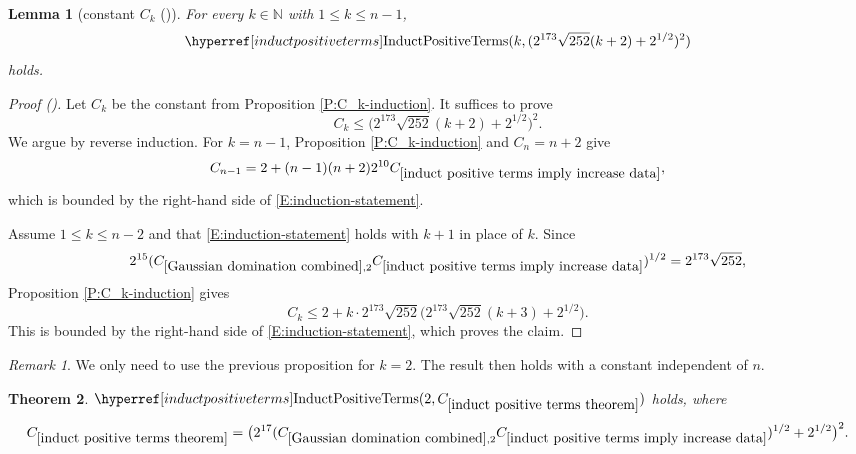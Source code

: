 \documentclass[12pt,reqno]{amsart}
\newcommand{\auto}{{({\tiny\faCar})}}
\theoremstyle{plain}
\newtheorem{theorem}{Theorem}[section]
\newtheorem{lemma}[theorem]{Lemma}
\numberwithin{equation}{section}
\theoremstyle{remark}
\newtheorem{rem}{Remark}[section]
\newcommand{\uses}[1]{}
\newcommand{\usesdefs}[1]{}
\newcommand{\N}{{\mathbb N}}
\newcommand{\ls}[1]{{\color{red}{[L: #1]}}}
\newcommand{\jr}[1]{{\color{orange}{[J: #1]}}}
\begin{document}
\ls{I have improved the constants, so that the final result holds with a constant independent of $n$.}
\jr{Oh, of course, because we only lose $k$ in the $k$th step and this is killed by the square root! So it was there already, I just inefficiently estimated the inducted constant, my bad! Very nice}
\begin{lemma}[constant $C_k$ \auto]\label{P:better-induction}\uses{P:C_k-induction,Gaussian domination combined,induct positive terms imply increase data}\usesdefs{induct positive terms}
For every $k\in\N$ with $1\le k\le n-1$,
\begin{equation}\label{auto:positive-induction-local-bound}
\InductPositiveTerms{k,
(2^{173}\sqrt{252}(k+2)+2^{1/2})^2}
\end{equation}
holds.
\end{lemma}
\begin{proof}[Proof \auto]
Let $C_k$ be the constant from Proposition \ref{P:C_k-induction}. It suffices to prove
\begin{equation}\label{E:induction-statement}
C_k\le
\bigl(2^{173}\sqrt{252}(k+2)+2^{1/2}\bigr)^2.
\end{equation}
We argue by reverse induction. For $k=n-1$, Proposition \ref{P:C_k-induction} and $C_n=n+2$ give
\[
C_{n-1}
=2+(n-1)(n+2)2^{10}C_{\ref{induct positive terms imply increase data}},
\]
which is bounded by the right-hand side of \eqref{E:induction-statement}.

Assume $1\le k\le n-2$ and that \eqref{E:induction-statement} holds with $k+1$ in place of $k$. Since
\[
2^{15}(C_{\ref{Gaussian domination combined},2}C_{\ref{induct positive terms imply increase data}})^{1/2}
=2^{173}\sqrt{252},
\]
Proposition \ref{P:C_k-induction} gives
\[
C_k
\le
2+k\cdot2^{173}\sqrt{252}
\bigl(2^{173}\sqrt{252}(k+3)+2^{1/2}\bigr).
\]
This is bounded by the right-hand side of \eqref{E:induction-statement}, which proves the claim.
\end{proof}

\begin{rem}
We only need to use the previous proposition for $k=2$. The result then holds with a constant independent of $n$.
\end{rem}

\begin{theorem}\label{induct positive terms theorem}\uses{P:better-induction,P:C_k-induction}\usesdefs{induct positive terms}
$\InductPositiveTerms{2,C_{\ref{induct positive terms theorem}}}$ holds, where
\begin{equation}\label{auto:positive-induction-constant-definition}
C_{\ref{induct positive terms theorem}}
=
\bigl(2^{17}(C_{\ref{Gaussian domination combined},2}C_{\ref{induct positive terms imply increase data}})^{1/2}+2^{1/2}\bigr)^2.
\end{equation}
\end{theorem}
\end{document}
